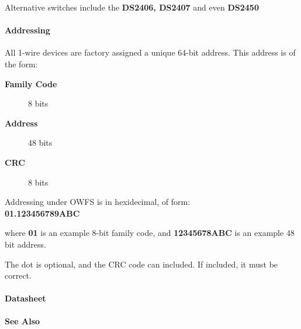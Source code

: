 Alternative switches include the \textbf{DS2406, DS2407} and even \textbf{DS2450} 
\paragraph*{Addressing}

         All 1-wire devices are factory assigned a unique 64-bit address.
This address is of the form: \begin{description}
\item [\textbf{Family Code} ] 8 bits 
\item [\textbf{Address} ] 48 bits 
\item [\textbf{CRC} ] 8 bits

\end{description}


\begin{description}
\item [Addressing under OWFS is in hexidecimal, of form: ] 
\item [\textbf{01.123456789ABC} ] 
\end{description}


where
\textbf{01} is an example 8-bit family code, and \textbf{12345678ABC} is an example 48 bit
address. 

The dot is optional, and the CRC code can included. If included,
it must be correct.  
\paragraph*{Datasheet}




\paragraph*{See Also}

